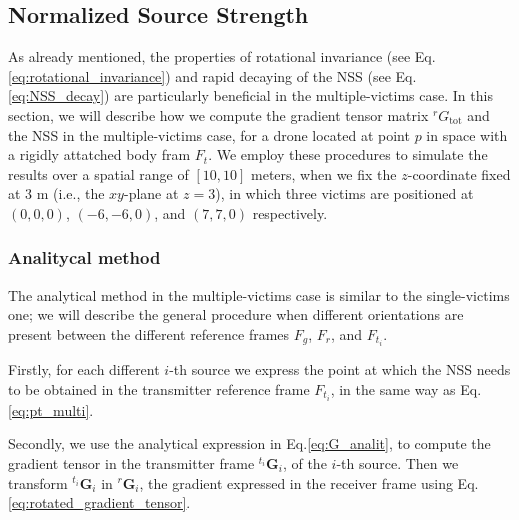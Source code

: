 \subsection{Normalized Source Strength}
As already mentioned, the properties of rotational invariance (see Eq.\ref{eq:rotational_invariance}) 
and rapid decaying of the NSS (see Eq.\ref{eq:NSS_decay}) are 
particularly beneficial in the multiple-victims case.
In this section, we will describe how we compute the gradient tensor matrix 
${}^r G_{\text{tot}}$ and the NSS in the multiple-victims case,
for a drone located at point $p$ in space with a rigidly attatched body fram $F_t$.
We employ these procedures to simulate the results over a spatial range of $[10, 10]$ meters, 
when we fix the $z$-coordinate fixed at 3 m (i.e., the \( xy \)-plane at \( z = 3 \)), 
in which three victims are positioned at \((0, 0, 0)\), \((-6, -6, 0)\), and \((7, 7, 0)\) respectively.


\subsubsection{Analitycal method}
The analytical method in the multiple-victims case is similar to the single-victims one;
we will describe the general procedure when different orientations
are present between the different reference frames $F_g$, $F_r$, and $F_{t_i}$.

Firstly, for each different $i$-th source we express the point at which the NSS needs to be obtained
in the transmitter reference frame $F_{t_i}$, in the same way as Eq.\ref{eq:pt_multi}.

Secondly, we use the analytical expression in Eq.\ref{eq:G_analit}, to compute the gradient tensor 
in the transmitter frame ${}^{t_i} \mathbf{G}_i$, of the $i$-th source.
Then we transform ${}^{t_i} \mathbf{G}_i$ in ${}^r \mathbf{G}_i$, the gradient expressed in the receiver frame using Eq.\ref{eq:rotated_gradient_tensor}.


